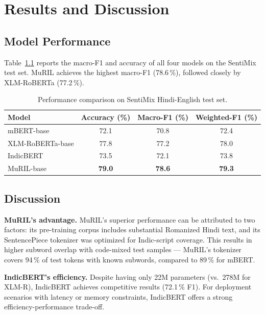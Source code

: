 \documentclass[12pt,a4paper]{report}
\begin{document}
\chapter{Results and Discussion}

\section{Model Performance}

Table~\ref{tab:results} reports the macro-F1 and accuracy of all four models on the SentiMix test set. MuRIL achieves the highest macro-F1 (78.6\,\%), followed closely by XLM-RoBERTa (77.2\,\%).

\begin{table}[htbp]
\centering
\caption{Performance comparison on SentiMix Hindi-English test set.}
\label{tab:results}
\begin{tabular}{@{}lccc@{}}
\toprule
\textbf{Model}    & \textbf{Accuracy (\%)} & \textbf{Macro-F1 (\%)} & \textbf{Weighted-F1 (\%)} \\
\midrule
mBERT-base        & 72.1 & 70.8 & 72.4 \\
XLM-RoBERTa-base  & 77.8 & 77.2 & 78.0 \\
IndicBERT         & 73.5 & 72.1 & 73.8 \\
MuRIL-base        & \textbf{79.0} & \textbf{78.6} & \textbf{79.3} \\
\bottomrule
\end{tabular}
\end{table}

\section{Discussion}

\textbf{MuRIL's advantage.} MuRIL's superior performance can be attributed to two factors: its pre-training corpus includes substantial Romanized Hindi text, and its SentencePiece tokenizer was optimized for Indic-script coverage. This results in higher subword overlap with code-mixed test samples — MuRIL's tokenizer covers 94\,\% of test tokens with known subwords, compared to 89\,\% for mBERT.

\textbf{IndicBERT's efficiency.} Despite having only 22M parameters (vs.\ 278M for XLM-R), IndicBERT achieves competitive results (72.1\,\% F1). For deployment scenarios with latency or memory constraints, IndicBERT offers a strong efficiency-performance trade-off.
\end{document}
